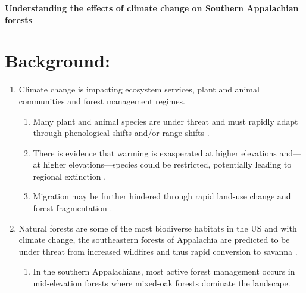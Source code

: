 \documentclass{article}\usepackage[]{graphicx}\usepackage[]{color}
\begin{document}
\noindent \textbf{\Large{Understanding the effects of climate change on Southern Appalachian forests }}

\renewcommand{\thetable}{\arabic{table}}
\renewcommand{\thefigure}{\arabic{figure}}
\renewcommand{\labelitemi}{$-$}


\section*{Background:}
\begin{enumerate}
\item Climate change is impacting ecosystem services, plant and animal communities and forest management regimes. 
  \begin{enumerate}
  \item Many plant and animal species are under threat and must rapidly adapt through phenological shifts and/or range shifts \citep{Parmesan2003, Schwartz2006}.
  \item There is evidence that warming is exasperated at higher elevations \citep{Giorgi1997,Rangwala2012,Pepin2015} and---at higher elevations---species could be restricted, potentially leading to regional extinction \citep{Bachelet2001, Potter2008}.
  \item Migration may be further hindered through rapid land-use change and forest fragmentation \citep{Opdam2004}.
  \end{enumerate}
  
\item Natural forests are some of the most biodiverse habitats in the US \citep{White1988} and with climate change, the southeastern forests of Appalachia are predicted to be under threat from increased wildfires and thus rapid conversion to savanna \citep{Bachelet2001}.
  \begin{enumerate}
  \item In the southern Appalachians, most active forest management occurs in mid-elevation forests where mixed-oak forests dominate the landscape. %
  \end{enumerate}
\end{enumerate}
\end{document}
